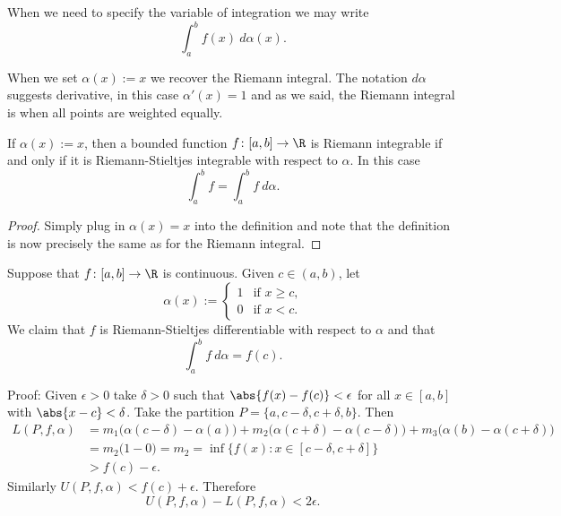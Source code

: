 When we need to specify the variable of integration we may write
\begin{equation*}
\int_a^b f(x) ~d\alpha(x) .
\end{equation*}

When we set $\alpha(x) := x$ we recover the Riemann integral.  The notation
$d\alpha$ suggests derivative, in this case $\alpha'(x) = 1$ and as we
said, the Riemann integral is when all points are weighted equally.

\begin{prop}
If $\alpha(x) := x$, then a bounded function $f \colon [a,b] \to \R$
is Riemann integrable if and only if it is Riemann-Stieltjes integrable
with respect to $\alpha$.  In this case
\begin{equation*}
\int_a^b f = \int_a^b f~d\alpha .
\end{equation*}
\end{prop}

\begin{proof}
Simply plug in $\alpha(x) = x$ into the definition and note that
the definition is now precisely the same as for the Riemann integral.
\end{proof}

\begin{example}
Suppose that $f \colon [a,b] \to \R$ is continuous.
Given $c \in (a,b)$, let 
\begin{equation*}
\alpha(x) :=
\begin{cases}
1 & \text{if $x \geq c$,} \\
0 & \text{if $x < c$.}
\end{cases}
\end{equation*}
We claim that $f$ is Riemann-Stieltjes differentiable with respect to
$\alpha$ and that
\begin{equation*}
\int_a^b f~d\alpha = f(c) .
\end{equation*}

Proof: Given $\epsilon > 0$ take $\delta > 0$ such
that $\abs{f(x)-f(c)} < \epsilon$ for all $x \in [a,b]$
with $\abs{x-c} < \delta$.
Take the partition $P = \{ a , c-\delta,
c+\delta, b \}$.  Then
\begin{equation*}
\begin{split}
L(P,f,\alpha)
& =
m_1 \bigl( \alpha(c-\delta) - \alpha(a) \bigr)
+
m_2 \bigl( \alpha(c+\delta) - \alpha(c-\delta) \bigr)
+
m_3 \bigl( \alpha(b) - \alpha(c+\delta) \bigr)
\\
& =
m_2 \bigl( 1 - 0 ) = m_2 = \inf \{ f(x) : x \in [c-\delta,c+\delta] \}
\\
& >
f(c) - \epsilon .
\end{split}
\end{equation*}
Similarly $U(P,f,\alpha) < f(c)+\epsilon$.  Therefore
\begin{equation}
U(P,f,\alpha)-L(P,f,\alpha) < 2 \epsilon .
\end{equation}
\end{example}


